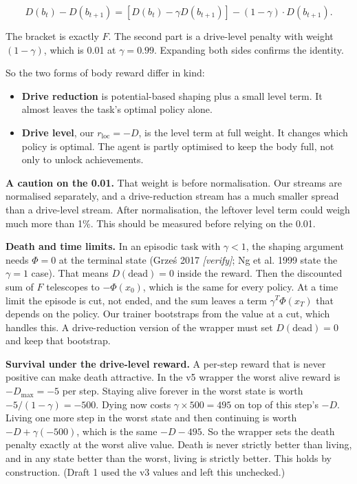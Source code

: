 \documentclass[11pt]{article}
\begin{document}
\[
D(b_t) - D(b_{t+1}) = [D(b_t) - \gamma D(b_{t+1})] - (1 - \gamma)\cdot D(b_{t+1}).
\]

The bracket is exactly $F$. The second part is a drive-level penalty with weight $(1 - \gamma)$, which is 0.01 at $\gamma = 0.99$. Expanding both sides confirms the identity.

So the two forms of body reward differ in kind:

\begin{itemize}
\item \textbf{Drive reduction} is potential-based shaping plus a small level term. It almost leaves the task's optimal policy alone.
\item \textbf{Drive level}, our $r_{\text{loc}} = -D$, is the level term at full weight. It changes which policy is optimal. The agent is partly optimised to keep the body full, not only to unlock achievements.
\end{itemize}

\textbf{A caution on the 0.01.} That weight is before normalisation. Our streams are normalised separately, and a drive-reduction stream has a much smaller spread than a drive-level stream. After normalisation, the leftover level term could weigh much more than 1\%. This should be measured before relying on the 0.01.

\textbf{Death and time limits.} In an episodic task with $\gamma < 1$, the shaping argument needs $\Phi = 0$ at the terminal state (Grześ 2017 \textit{[verify]}; Ng et al. 1999 state the $\gamma = 1$ case). That means $D(\text{dead}) = 0$ inside the reward. Then the discounted sum of $F$ telescopes to $-\Phi(x_0)$, which is the same for every policy. At a time limit the episode is cut, not ended, and the sum leaves a term $\gamma^T \Phi(x_T)$ that depends on the policy. Our trainer bootstraps from the value at a cut, which handles this. A drive-reduction version of the wrapper must set $D(\text{dead}) = 0$ and keep that bootstrap.

\textbf{Survival under the drive-level reward.} A per-step reward that is never positive can make death attractive. In the v5 wrapper the worst alive reward is $-D_{\max} = -5$ per step. Staying alive forever in the worst state is worth $-5/(1 - \gamma) = -500$. Dying now costs $\gamma \times 500 = 495$ on top of this step's $-D$. Living one more step in the worst state and then continuing is worth $-D + \gamma(-500)$, which is the same $-D - 495$. So the wrapper sets the death penalty exactly at the worst alive value. Death is never strictly better than living, and in any state better than the worst, living is strictly better. This holds by construction. (Draft 1 used the v3 values and left this unchecked.)
\end{document}

